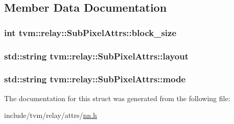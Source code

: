 \subsection{Member Data Documentation}
\subsubsection[{\texorpdfstring{block\+\_\+size}{block_size}}]{\setlength{\rightskip}{0pt plus 5cm}int tvm\+::relay\+::\+Sub\+Pixel\+Attrs\+::block\+\_\+size}\hypertarget{structtvm_1_1relay_1_1SubPixelAttrs_a3ed42c597dec511790e76463b4120909}{}\label{structtvm_1_1relay_1_1SubPixelAttrs_a3ed42c597dec511790e76463b4120909}
\subsubsection[{\texorpdfstring{layout}{layout}}]{\setlength{\rightskip}{0pt plus 5cm}std\+::string tvm\+::relay\+::\+Sub\+Pixel\+Attrs\+::layout}\hypertarget{structtvm_1_1relay_1_1SubPixelAttrs_a4002e880dba9afdd8b96c8b713f4b6aa}{}\label{structtvm_1_1relay_1_1SubPixelAttrs_a4002e880dba9afdd8b96c8b713f4b6aa}
\subsubsection[{\texorpdfstring{mode}{mode}}]{\setlength{\rightskip}{0pt plus 5cm}std\+::string tvm\+::relay\+::\+Sub\+Pixel\+Attrs\+::mode}\hypertarget{structtvm_1_1relay_1_1SubPixelAttrs_a6f0822aa1ad7672a18ab73c64e83fa99}{}\label{structtvm_1_1relay_1_1SubPixelAttrs_a6f0822aa1ad7672a18ab73c64e83fa99}


The documentation for this struct was generated from the following file\+:\begin{DoxyCompactItemize}
\item 
include/tvm/relay/attrs/\hyperlink{include_2tvm_2relay_2attrs_2nn_8h}{nn.\+h}\end{DoxyCompactItemize}
